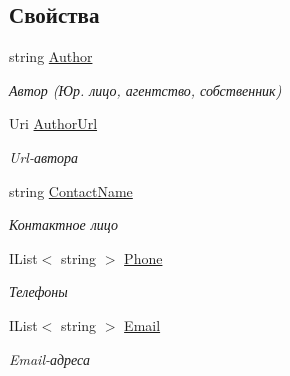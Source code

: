 \subsection*{Свойства}
\begin{DoxyCompactItemize}
\item 
string \hyperlink{class_r_t_1_1_parsing_libs_1_1_models_1_1_web_publication_contact_acc84023c3534ee76f037ce31f8b1de07}{Author}
\begin{DoxyCompactList}\small\item\em Автор (Юр. лицо, агентство, собственник) \end{DoxyCompactList}\item 
Uri \hyperlink{class_r_t_1_1_parsing_libs_1_1_models_1_1_web_publication_contact_a74f50fc2119d21f385cf0be3ffba017a}{Author\+Url}
\begin{DoxyCompactList}\small\item\em Url-\/автора \end{DoxyCompactList}\item 
string \hyperlink{class_r_t_1_1_parsing_libs_1_1_models_1_1_web_publication_contact_a3bb18cb27f2186a1bc85551d48e51942}{Contact\+Name}
\begin{DoxyCompactList}\small\item\em Контактное лицо \end{DoxyCompactList}\item 
I\+List$<$ string $>$ \hyperlink{class_r_t_1_1_parsing_libs_1_1_models_1_1_web_publication_contact_a677eda8201ac2dc737655b5c1aa6e33e}{Phone}
\begin{DoxyCompactList}\small\item\em Телефоны \end{DoxyCompactList}\item 
I\+List$<$ string $>$ \hyperlink{class_r_t_1_1_parsing_libs_1_1_models_1_1_web_publication_contact_a4034e95ec912992f06d1644f271d3e8f}{Email}
\begin{DoxyCompactList}\small\item\em Email-\/адреса \end{DoxyCompactList}\item 

\end{DoxyCompactItemize}
